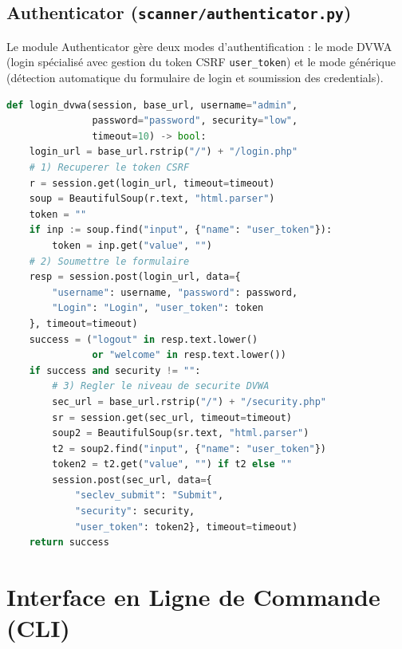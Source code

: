 \documentclass[12pt,a4paper]{report}
\newcommand{\code}[1]{\texttt{#1}}
\begin{document}
\subsection{Authenticator (\texttt{scanner/authenticator.py})}

Le module Authenticator gère deux modes d'authentification : le mode DVWA (login spécialisé
avec gestion du token CSRF \code{user\_token}) et le mode générique (détection automatique
du formulaire de login et soumission des credentials).

\begin{lstlisting}[language=python, caption={Fonction login\_dvwa() — authentification DVWA}]
def login_dvwa(session, base_url, username="admin",
               password="password", security="low",
               timeout=10) -> bool:
    login_url = base_url.rstrip("/") + "/login.php"
    # 1) Recuperer le token CSRF
    r = session.get(login_url, timeout=timeout)
    soup = BeautifulSoup(r.text, "html.parser")
    token = ""
    if inp := soup.find("input", {"name": "user_token"}):
        token = inp.get("value", "")
    # 2) Soumettre le formulaire
    resp = session.post(login_url, data={
        "username": username, "password": password,
        "Login": "Login", "user_token": token
    }, timeout=timeout)
    success = ("logout" in resp.text.lower()
               or "welcome" in resp.text.lower())
    if success and security != "":
        # 3) Regler le niveau de securite DVWA
        sec_url = base_url.rstrip("/") + "/security.php"
        sr = session.get(sec_url, timeout=timeout)
        soup2 = BeautifulSoup(sr.text, "html.parser")
        t2 = soup2.find("input", {"name": "user_token"})
        token2 = t2.get("value", "") if t2 else ""
        session.post(sec_url, data={
            "seclev_submit": "Submit",
            "security": security,
            "user_token": token2}, timeout=timeout)
    return success
\end{lstlisting}

\section{Interface en Ligne de Commande (CLI)}
\end{document}
